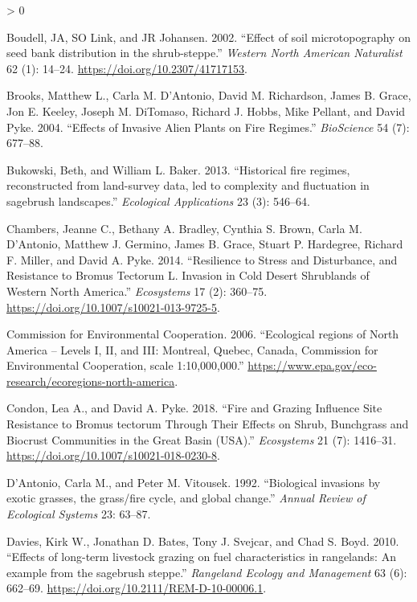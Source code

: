 \documentclass[
  12pt,
]{article}
\newlength{\cslhangindent}
\newenvironment{CSLReferences}[2] %
 {%
  \setlength{\parindent}{0pt}
  \ifodd #1 \everypar{\setlength{\hangindent}{\cslhangindent}}\ignorespaces\fi
  \ifnum #2 > 0
  \setlength{\parskip}{#2\baselineskip}
  \fi
 }%
 {}
\begin{document}
\begin{CSLReferences}{1}{0}
\leavevmode\hypertarget{ref-Boudell2002}{}%
Boudell, JA, SO Link, and JR Johansen. 2002. {``{Effect of soil
microtopography on seed bank distribution in the shrub-steppe}.''}
\emph{Western North American Naturalist} 62 (1): 14--24.
\url{https://doi.org/10.2307/41717153}.

\leavevmode\hypertarget{ref-Brooks2004}{}%
Brooks, Matthew L., Carla M. D'Antonio, David M. Richardson, James B.
Grace, Jon E. Keeley, Joseph M. DiTomaso, Richard J. Hobbs, Mike
Pellant, and David Pyke. 2004. {``{Effects of Invasive Alien Plants on
Fire Regimes}.''} \emph{BioScience} 54 (7): 677--88.

\leavevmode\hypertarget{ref-Bukowski2013}{}%
Bukowski, Beth, and William L. Baker. 2013. {``{Historical fire regimes,
reconstructed from land-survey data, led to complexity and fluctuation
in sagebrush landscapes}.''} \emph{Ecological Applications} 23 (3):
546--64.

\leavevmode\hypertarget{ref-chambers_resilience_2014}{}%
Chambers, Jeanne C., Bethany A. Bradley, Cynthia S. Brown, Carla M.
D'Antonio, Matthew J. Germino, James B. Grace, Stuart P. Hardegree,
Richard F. Miller, and David A. Pyke. 2014. {``Resilience to Stress and
Disturbance, and Resistance to {Bromus} Tectorum {L}. Invasion in Cold
Desert Shrublands of Western {North} {America}.''} \emph{Ecosystems} 17
(2): 360--75. \url{https://doi.org/10.1007/s10021-013-9725-5}.

\leavevmode\hypertarget{ref-CEC2006}{}%
Commission for Environmental Cooperation. 2006. {``{Ecological regions
of North America -- Levels I, II, and III: Montreal, Quebec, Canada,
Commission for Environmental Cooperation, scale 1:10,000,000}.''}
\url{https://www.epa.gov/eco-research/ecoregions-north-america}.

\leavevmode\hypertarget{ref-Condon2018}{}%
Condon, Lea A., and David A. Pyke. 2018. {``{Fire and Grazing Influence
Site Resistance to Bromus tectorum Through Their Effects on Shrub,
Bunchgrass and Biocrust Communities in the Great Basin (USA)}.''}
\emph{Ecosystems} 21 (7): 1416--31.
\url{https://doi.org/10.1007/s10021-018-0230-8}.

\leavevmode\hypertarget{ref-DAntonio1992}{}%
D'Antonio, Carla M., and Peter M. Vitousek. 1992. {``{Biological
invasions by exotic grasses, the grass/fire cycle, and global
change}.''} \emph{Annual Review of Ecological Systems} 23: 63--87.

\leavevmode\hypertarget{ref-Davies2010}{}%
Davies, Kirk W., Jonathan D. Bates, Tony J. Svejcar, and Chad S. Boyd.
2010. {``{Effects of long-term livestock grazing on fuel characteristics
in rangelands: An example from the sagebrush steppe}.''} \emph{Rangeland
Ecology and Management} 63 (6): 662--69.
\url{https://doi.org/10.2111/REM-D-10-00006.1}.


\end{CSLReferences}
\end{document}
